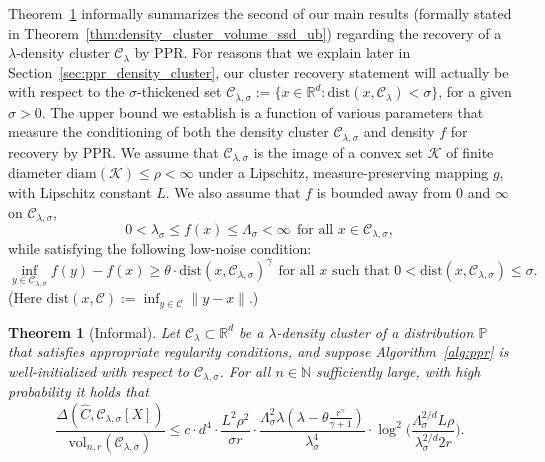 \documentclass[11pt,twoside]{article}
\newtheorem{theorem}{Theorem}
\theoremstyle{definition}
\newcommand{\Reals}{\mathbb{R}}
\newcommand{\1}{\mathbf{1}}
\newcommand{\Rd}{\Reals^d}
\newcommand{\mc}[1]{\mathcal{#1}}
\newcommand{\Pbb}{\mathbb{P}}
\newcommand{\wh}[1]{\widehat{#1}}
\newcommand{\dist}{\mathrm{dist}}
\newcommand{\vol}{\mathrm{vol}}
\begin{document}
Theorem~\ref{thm:density_cluster_volume_ssd_ub_informal} informally summarizes the second of our main results (formally stated in Theorem~\ref{thm:density_cluster_volume_ssd_ub}) regarding the recovery of a $\lambda$-density cluster $\mc{C}_{\lambda}$ by PPR. For reasons that we explain later in Section~\ref{sec:ppr_density_cluster}, our cluster recovery statement will actually be with respect to the $\sigma$-thickened set $\mc{C}_{\lambda,\sigma} := \{x \in \Rd: \mathrm{dist}(x,\mc{C}_{\lambda}) < \sigma\}$, for a given $\sigma > 0$. The upper bound we establish is a function of various parameters that measure the conditioning of both the density cluster $\mc{C}_{\lambda,\sigma}$ and density $f$ for recovery by PPR. We assume that $\mc{C}_{\lambda,\sigma}$ is the image of a convex set $\mc{K}$ of finite diameter $\mathrm{diam}(\mc{K}) \leq \rho < \infty$ under a Lipschitz, measure-preserving mapping $g$, with Lipschitz constant $L$. We also assume that $f$ is bounded away from $0$ and $\infty$ on $\mc{C}_{\lambda,\sigma}$,
\begin{equation*}
0 < \lambda_{\sigma} \leq f(x) \leq \Lambda_{\sigma} < \infty~~\textrm{for all $x \in \mc{C}_{\lambda,\sigma}$},
\end{equation*}
while satisfying the following low-noise condition:
\begin{equation*}
\inf_{y \in \mc{C}_{\lambda,\sigma}} f(y) - f(x) \geq  \theta \cdot \dist(x, \mc{C}_{\lambda,\sigma})^{\gamma}~~\textrm{for all $x$ such that $0 < \dist(x,\mc{C}_{\lambda,\sigma}) \leq \sigma$.}
\end{equation*}
(Here $\dist(x,\mc{C}) := \inf_{y \in \mc{C}} \|y - x\|$.) 
\begin{theorem}[Informal]
	\label{thm:density_cluster_volume_ssd_ub_informal}
	Let $\mc{C}_{\lambda} \subset \Rd$ be a $\lambda$-density cluster of a distribution $\Pbb$ that satisfies appropriate regularity conditions, and suppose Algorithm~\ref{alg:ppr} is well-initialized with respect to $\mc{C}_{\lambda,\sigma}$. For all $n \in \mathbb{N}$ sufficiently large, with high probability it holds that
	\begin{equation}
	\label{eqn:density_cluster_volume_ssd_ub_informal}
	\frac{\Delta(\wh{C},\mc{C}_{\lambda,\sigma}[X])}{\vol_{n,r}(\mc{C}_{\lambda,\sigma})} \leq c \cdot d^4 \cdot \frac{L^2\rho^2}{\sigma r} \cdot \frac{\Lambda_{\sigma}^2 \lambda (\lambda - \theta \frac{r^{\gamma}}{\gamma + 1})}{\lambda_{\sigma}^4} \cdot \log^2\biggl(\frac{\Lambda_{\sigma}^{2/d} L\rho}{\lambda_{\sigma}^{2/d}2r}\biggr).
	\end{equation}
\end{theorem}
\end{document}

